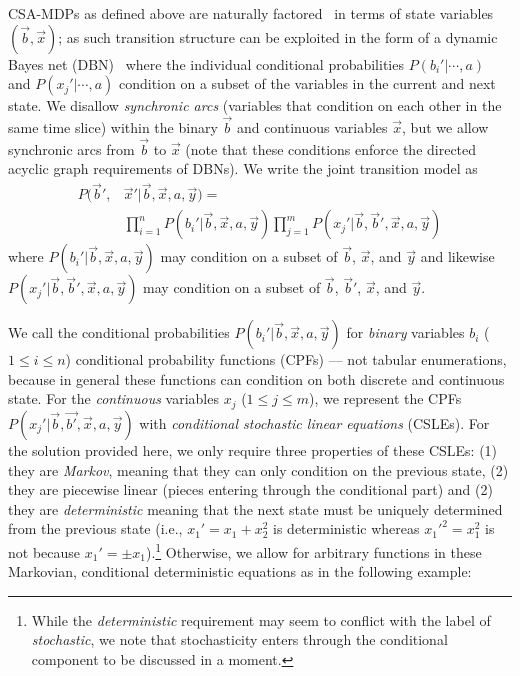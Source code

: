 \documentclass[letterpaper]{article}
\begin{document}
CSA-MDPs as defined above are naturally factored~\cite{boutilier99dt}
in terms of state variables $(\vec{b},\vec{x})$; as such transition
structure can be exploited in the form of a dynamic Bayes net
(DBN)~\cite{dbn} where the individual conditional probabilities
$P(b_i'|\cdots,a)$ and $P(x_j'|\cdots,a)$ condition on a subset of the
variables in the current and next state.  We disallow \emph{synchronic
arcs} (variables that condition on each other in the same time slice) 
within the binary $\vec{b}$ and continuous variables $\vec{x}$, 
but we allow synchronic arcs from $\vec{b}$ to $\vec{x}$ (note that
these conditions enforce the directed acyclic graph requirements of
DBNs).
We write the joint transition model as
\begin{align}
P(\vec{b}',&\vec{x}'|\vec{b},\vec{x},a,\vec{y}) = \label{eq:dbn} \\
& \prod_{i=1}^n P(b_i'|\vec{b},\vec{x},a,\vec{y}) \prod_{j=1}^m P(x_j'|\vec{b},\vec{b}',\vec{x},a,\vec{y}) \nonumber 
\end{align}
where $P(b_i'|\vec{b},\vec{x},a,\vec{y})$ may condition on a subset of
$\vec{b}$, $\vec{x}$, and $\vec{y}$ and likewise 
$P(x_j'|\vec{b},\vec{b}',\vec{x},a,\vec{y})$ may condition on a subset of
$\vec{b}$, $\vec{b}'$, $\vec{x}$, and $\vec{y}$.

We call the conditional probabilities
$P(b_i'|\vec{b},\vec{x},a,\vec{y})$ for \emph{binary} variables $b_i$
($1 \leq i \leq n$) conditional probability functions (CPFs) --- not
tabular enumerations, because in general these functions can condition
on both discrete and continuous state.  For the \emph{continuous}
variables $x_j$ ($1 \leq j \leq m$), we represent the CPFs
$P(x_j'|\vec{b},\vec{b'},\vec{x},a,\vec{y})$ with \emph{conditional
stochastic linear equations} (CSLEs).  For the solution provided here,
we only require three properties of these CSLEs: (1) they are
\emph{Markov}, meaning that they can only condition on the previous
state, (2) they are piecewise linear (pieces entering through the
conditional part) and (2) they are \emph{deterministic} meaning that
the next state must be uniquely determined from the previous state
(i.e., $x_1' = x_1 + x_2^2$ is deterministic whereas $x_1'^2 = x_1^2$
is not because $x_1' = \pm x_1$).\footnote{While the
\emph{deterministic} requirement may seem to conflict with the label
of \emph{stochastic}, we note that stochasticity enters through the
conditional component to be discussed in a moment.}  Otherwise, we
allow for arbitrary functions in these Markovian, conditional
deterministic equations as in the following example:
\vspace{-3mm}
\end{document}
